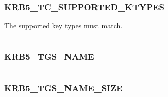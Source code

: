 \documentclass[letterpaper,10pt,english]{sphinxmanual}
\begin{document}
\subsubsection{KRB5\_TC\_SUPPORTED\_KTYPES}
\label{appdev/refs/macros/KRB5_TC_SUPPORTED_KTYPES:krb5-tc-supported-ktypes-data}\label{appdev/refs/macros/KRB5_TC_SUPPORTED_KTYPES::doc}\label{appdev/refs/macros/KRB5_TC_SUPPORTED_KTYPES:krb5-tc-supported-ktypes}

\begin{fulllineitems}
\label{appdev/refs/macros/KRB5_TC_SUPPORTED_KTYPES:KRB5_TC_SUPPORTED_KTYPES}
\end{fulllineitems}


The supported key types must match.

\begin{tabulary}{\linewidth}{|L|L|}
\hline

 & 
\\\hline
\end{tabulary}



\subsubsection{KRB5\_TGS\_NAME}
\label{appdev/refs/macros/KRB5_TGS_NAME:krb5-tgs-name-data}\label{appdev/refs/macros/KRB5_TGS_NAME::doc}\label{appdev/refs/macros/KRB5_TGS_NAME:krb5-tgs-name}

\begin{fulllineitems}
\label{appdev/refs/macros/KRB5_TGS_NAME:KRB5_TGS_NAME}
\end{fulllineitems}


\begin{tabulary}{\linewidth}{|L|L|}
\hline

 & 
\\\hline
\end{tabulary}



\subsubsection{KRB5\_TGS\_NAME\_SIZE}
\label{appdev/refs/macros/KRB5_TGS_NAME_SIZE:krb5-tgs-name-size}\label{appdev/refs/macros/KRB5_TGS_NAME_SIZE:krb5-tgs-name-size-data}\label{appdev/refs/macros/KRB5_TGS_NAME_SIZE::doc}
\end{document}
